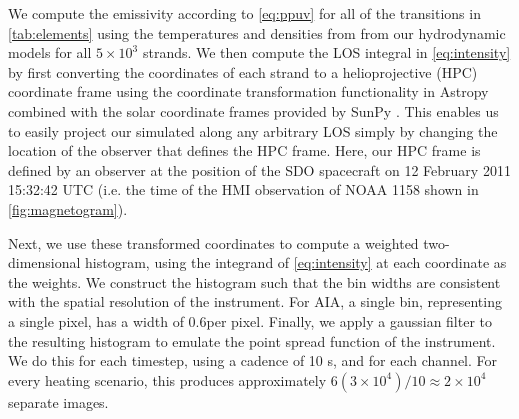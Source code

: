We compute the emissivity according to \autoref{eq:ppuv} for all of the transitions in \autoref{tab:elements} using the temperatures and densities from from our hydrodynamic models for all $5\times10^3$ strands. We then compute the LOS integral in \autoref{eq:intensity} by first converting the coordinates of each strand to a helioprojective (HPC) coordinate frame \citep[see][]{thompson_coordinate_2006} using the coordinate transformation functionality in Astropy \citep{the_astropy_collaboration_astropy_2018} combined with the solar coordinate frames provided by SunPy \citep{sunpy_community_sunpypython_2015}. This enables us to easily project our simulated \AR{} along any arbitrary LOS simply by changing the location of the observer that defines the HPC frame. Here, our HPC frame is defined by an observer at the position of the SDO spacecraft on 12 February 2011 15:32:42 UTC (i.e. the time of the HMI observation of NOAA 1158 shown in \autoref{fig:magnetogram}).

Next, we use these transformed coordinates to compute a weighted two-dimensional histogram, using the integrand of \autoref{eq:intensity} at each coordinate as the weights. We construct the histogram such that the bin widths are consistent with the spatial resolution of the instrument. For AIA, a single bin, representing a single pixel, has a width of 0.6\arcsec per pixel. Finally, we  apply a gaussian filter to the resulting histogram to emulate the point spread function of the instrument. We do this for each timestep, using a cadence of 10 s, and for each channel. For every heating scenario, this produces approximately $6(3\times10^4)/10\approx2\times10^4$ separate images.

